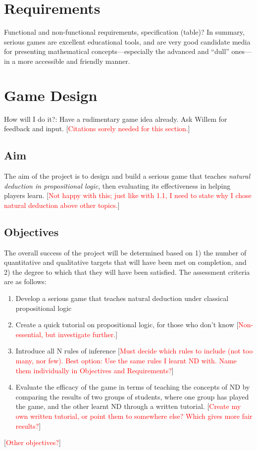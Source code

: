 \documentclass[a4paper]{article}
\newcommand{\comment}[1]{[\textcolor{red}{#1}]} %
\begin{document}
\section{Requirements} %
Functional and non-functional requirements, specification (table)?
In summary, serious games are excellent educational tools, and are very good candidate media for presenting mathematical concepts---especially the advanced and ``dull'' ones---in a more accessible and friendly manner.

\section{Game Design} %
How will I do it?: Have a rudimentary game idea already. Ask Willem for feedback and input.
\comment{Citations sorely needed for this section.}

\subsection{Aim}
The aim of the project is to design and build a serious game that teaches \emph{natural deduction in propositional logic}, then evaluating its effectiveness in helping players learn. \comment{Not happy with this; just like with 1.1, I need to state why I chose natural deduction above other topics.}

\subsection{Objectives}
The overall success of the project will be determined based on 1) the number of quantitative and qualitative targets that will have been met on completion, and 2) the degree to which that they will have been satisfied. The assessment criteria are as follows:
\begin{enumerate}
  \item Develop a serious game that teaches natural deduction under classical propositional logic
  \item Create a quick tutorial on propositional logic, for those who don't know \comment{Non-essential, but investigate further.}
  \item Introduce all N rules of inference \comment{Must decide which rules to include (not too many, nor few). Best option: Use the same rules I learnt ND with. Name them individually in Objectives and Requirements?}
  \item Evaluate the efficacy of the game in terms of teaching the concepts of ND by comparing the results of two groups of students, where one group has played the game, and the other learnt ND through a written tutorial. \comment{Create my own written tutorial, or point them to somewhere else? Which gives more fair results?}
\end{enumerate}
\comment{Other objectives?}
\end{document}
